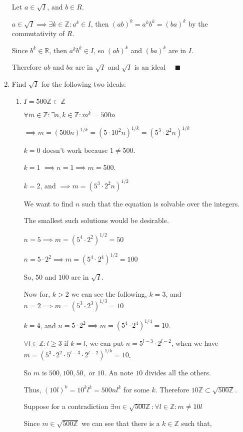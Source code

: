 \documentclass{article}
\newcommand\Z{\mathbb{Z}}
\newcommand\R{\mathbb{R}}
\begin{document}
\begin{enumerate}

Let $a\in \sqrt{I}$, and $b\in R$.

$a\in \sqrt{I}\implies \exists k\in\Z : a^k\in I$, then $(ab)^k = a^kb^k= (ba)^k$ by the commutativity of $R$.

Since $b^k\in \R$, then $a^kb^k\in I$, so $(ab)^k$ and $(ba)^k$ are in
$I$.

Therefore $ab$ and $ba$ are in $\sqrt{I}$ and $\sqrt{I}$ is an
ideal $\quad \blacksquare$
\newpage
\item Find $\sqrt{I}$ for the following two ideals:
\begin{enumerate}
\item $I = 500\Z \subset \Z$


  $\forall m\in \Z:\exists n,k\in \Z: m^k = 500n $

  $\implies m = (500n)^{1/k}= (5\cdot 10^2 n)^{1/k} = (5^3\cdot2^2
  n)^{1/k}  $

  $k = 0$ doesn't work because $1\neq 500$.

  $k=1$ $\implies n =1\implies m=500$.

  $k = 2$, and $\implies m = (5^3\cdot2^2n )^{1/2}$

  We want to find $n$ such that the equation is solvable over the
  integers.

  The smallest such solutions would be desirable.

  $n = 5 \implies m = (5^4\cdot2^2 )^{1/2} = 50$

  $n = 5\cdot2^2 \implies m = (5^4\cdot2^4 )^{1/2} = 100$

  So, $50$ and $100$ are in $\sqrt{I}$.

  Now for, $k>2$ we can see the following,
  $k = 3$, and $n = 2\implies m = (5^3\cdot2^3)^{1/3} = 10$

  $k = 4$, and $n = 5\cdot2^2 \implies m =(5^4\cdot2^4)^{1/4} = 10$.

  $\forall l\in \Z: l\geq 3$ if $k = l$, we can put $n = 5^{l-3}\cdot 2^{l-2}$, when we have $m = (5^3\cdot2^2
  \cdot 5^{l-3}\cdot 2^{l-2})^{1/k}=
  10$.

  So $m$ is $500,100,50,$ or $10$. An note $10$ divides all the
  others.

  Thus, $(10l)^k = 10^kl^k = 500nl^k$ for some $k$. Therefore $10\Z
  \subset \sqrt{500\Z}$.

  Suppose for a contradiction $\exists m \in \sqrt{500\Z}: \forall l\in\Z: m \neq 10l$


  Since $m\in \sqrt{500\Z}$ we can see that there is a $k\in \Z$ such
  that,


\end{enumerate}
\end{enumerate}
\end{document}
